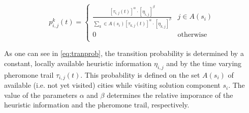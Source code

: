 \begin{homeworkProblem}
\begin{equation} 
p_{i,j}^k(t) = \begin{cases}
  \frac{[\tau_{i,j}(t)]^\alpha \cdot [\eta_{i,j}]^\beta}{\sum_{k} \in A(s_{i}) [\tau_{k,j}(t)]^\alpha \cdot [\eta_{k,j}]^\beta} & j \in A(s_{i}) \\
 0 & \text{otherwise} \\
\end{cases}
\end{equation}

As one can see in \ref{eq:tranprob}, the transition probability is determined by a constant, locally available heuristic information $\eta_{i,j}$ and by the time varying pheromone trail $\tau_{i,j}(t)$.
This probability is defined on the set $A(s_i)$ of available (i.e. not yet visited) cities while visiting solution component $s_i$.
The value of the parameters $\alpha$ and $\beta$ determines the relative imporance of the heuristic information and the pheromone trail, respectively.


 






\end{homeworkProblem}
